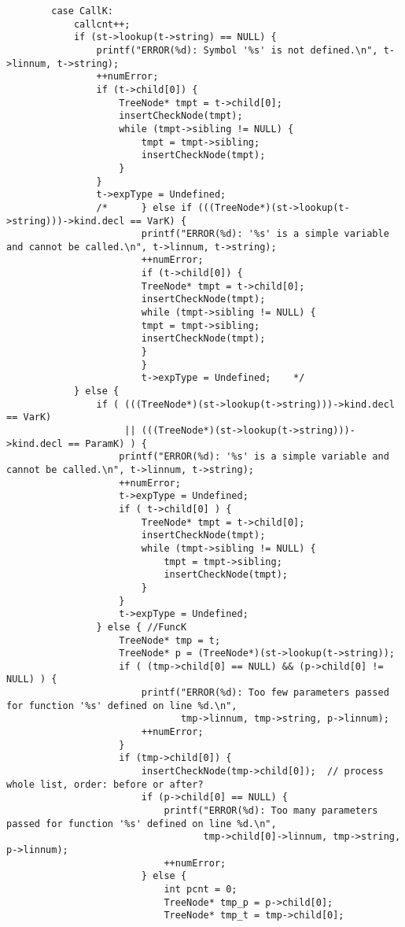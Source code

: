 \documentclass[12pt]{book}
\begin{document}
\begin{lstlisting}
        case CallK:
            callcnt++;
            if (st->lookup(t->string) == NULL) {
                printf("ERROR(%d): Symbol '%s' is not defined.\n", t->linnum, t->string);
                ++numError;
                if (t->child[0]) {
                    TreeNode* tmpt = t->child[0];
                    insertCheckNode(tmpt);
                    while (tmpt->sibling != NULL) {
                        tmpt = tmpt->sibling;
                        insertCheckNode(tmpt);
                    }
                }
                t->expType = Undefined; 
                /*      } else if (((TreeNode*)(st->lookup(t->string)))->kind.decl == VarK) { 
                        printf("ERROR(%d): '%s' is a simple variable and cannot be called.\n", t->linnum, t->string);
                        ++numError;
                        if (t->child[0]) {
                        TreeNode* tmpt = t->child[0];
                        insertCheckNode(tmpt);
                        while (tmpt->sibling != NULL) {
                        tmpt = tmpt->sibling;
                        insertCheckNode(tmpt);
                        }
                        }
                        t->expType = Undefined;    */
            } else {
                if ( (((TreeNode*)(st->lookup(t->string)))->kind.decl == VarK)
                     || (((TreeNode*)(st->lookup(t->string)))->kind.decl == ParamK) ) {
                    printf("ERROR(%d): '%s' is a simple variable and cannot be called.\n", t->linnum, t->string);
                    ++numError;
                    t->expType = Undefined;
                    if ( t->child[0] ) {
                        TreeNode* tmpt = t->child[0];
                        insertCheckNode(tmpt);
                        while (tmpt->sibling != NULL) {
                            tmpt = tmpt->sibling;
                            insertCheckNode(tmpt);
                        }
                    }
                    t->expType = Undefined; 
                } else { //FuncK
                    TreeNode* tmp = t; 
                    TreeNode* p = (TreeNode*)(st->lookup(t->string));
                    if ( (tmp->child[0] == NULL) && (p->child[0] != NULL) ) {
                        printf("ERROR(%d): Too few parameters passed for function '%s' defined on line %d.\n", 
                               tmp->linnum, tmp->string, p->linnum);
                        ++numError;
                    }
                    if (tmp->child[0]) {
                        insertCheckNode(tmp->child[0]);  // process whole list, order: before or after?
                        if (p->child[0] == NULL) {
                            printf("ERROR(%d): Too many parameters passed for function '%s' defined on line %d.\n", 
                                   tmp->child[0]->linnum, tmp->string, p->linnum);
                            ++numError;
                        } else {
                            int pcnt = 0;
                            TreeNode* tmp_p = p->child[0];
                            TreeNode* tmp_t = tmp->child[0];


\end{lstlisting}
\end{document}
